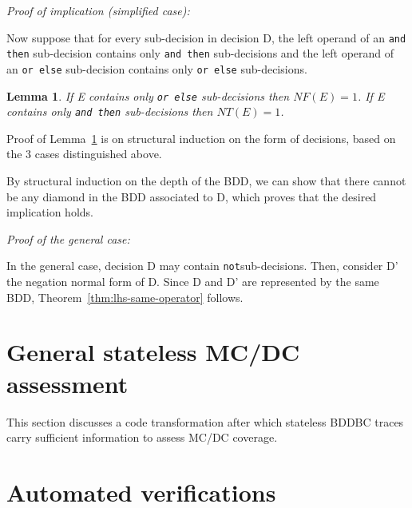\documentclass[a4paper,12pt,twoside]{article}
\newcommand{\andthen}{\texttt{and then}}
\newcommand{\orelse}{\texttt{or else}}
\newcommand{\adanot}{\texttt{not}}
\newtheorem{lemma}{Lemma}[subsection]
\begin{document}
\emph{Proof of implication (simplified case):}

Now suppose that for every sub-decision in decision D, the left
operand of an \andthen{} sub-decision contains only \andthen{}
sub-decisions and the left operand of an \orelse{} sub-decision
contains only \orelse{} sub-decisions.

\begin{lemma}
\label{lemma:NF-NT-only-one-oper}
If E contains only \orelse{} sub-decisions then $NF(E) = 1$.
If E contains only \andthen{} sub-decisions then $NT(E) = 1$.
\end{lemma}

Proof of Lemma~\ref{lemma:NF-NT-only-one-oper} is on structural induction on
the form of decisions, based on the 3 cases distinguished above.

By structural induction on the depth of the BDD, we can show that there cannot
be any diamond in the BDD associated to D, which proves that the desired
implication holds.

\emph{Proof of the general case:}

In the general case, decision D may contain \adanot sub-decisions. Then,
consider D' the negation normal form of D. Since D and D' are represented
by the same BDD, Theorem~\ref{thm:lhs-same-operator} follows.

\section{General stateless MC/DC assessment}

This section discusses a code transformation after which stateless BDDBC
traces carry sufficient information to assess MC/DC coverage.

\section{Automated verifications}

\newpage


\end{document}
